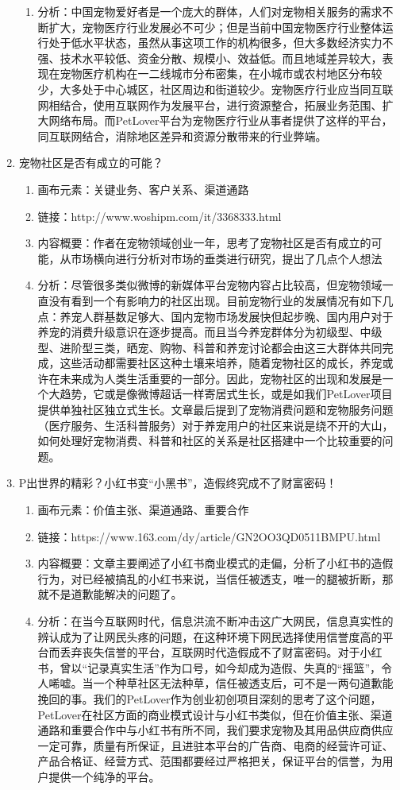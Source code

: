 \documentclass[a4paper]{ctexart}
\begin{document}
\begin{enumerate}[label=\alph*.]
\begin{enumerate}[label=\alph*.]
    \item 分析：中国宠物爱好者是一个庞大的群体，人们对宠物相关服务的需求不断扩大，宠物医疗行业发展必不可少；但是当前中国宠物医疗行业整体运行处于低水平状态，虽然从事这项工作的机构很多，但大多数经济实力不强、技术水平较低、资金分散、规模小、效益低。而且地域差异较大，表现在宠物医疗机构在一二线城市分布密集，在小城市或农村地区分布较少，大多处于中心城区，社区周边和街道较少。宠物医疗行业应当同互联网相结合，使用互联网作为发展平台，进行资源整合，拓展业务范围、扩大网络布局。而PetLover平台为宠物医疗行业从事者提供了这样的平台，同互联网结合，消除地区差异和资源分散带来的行业弊端。
  \end{enumerate}
  \item 宠物社区是否有成立的可能？
  \begin{enumerate}[label=\alph*.]
    \item 画布元素：关键业务、客户关系、渠道通路
    \item 链接：http://www.woshipm.com/it/3368333.html
    \item 内容概要：作者在宠物领域创业一年，思考了宠物社区是否有成立的可能，从市场横向进行分析对市场的垂类进行研究，提出了几点个人想法
    \item 分析：尽管很多类似微博的新媒体平台宠物内容占比较高，但宠物领域一直没有看到一个有影响力的社区出现。目前宠物行业的发展情况有如下几点：养宠人群基数足够大、国内宠物市场发展快但起步晚、国内用户对于养宠的消费升级意识在逐步提高。而且当今养宠群体分为初级型、中级型、进阶型三类，晒宠、购物、科普和养宠讨论都会由这三大群体共同完成，这些活动都需要社区这种土壤来培养，随着宠物社区的成长，养宠或许在未来成为人类生活重要的一部分。因此，宠物社区的出现和发展是一个大趋势，它或是像微博超话一样寄居式生长，或是如我们PetLover项目提供单独社区独立式生长。文章最后提到了宠物消费问题和宠物服务问题（医疗服务、生活科普服务）对于养宠用户的社区来说是绕不开的大山，如何处理好宠物消费、科普和社区的关系是社区搭建中一个比较重要的问题。
  \end{enumerate}
  \item P出世界的精彩？小红书变“小黑书”，造假终究成不了财富密码！
  \begin{enumerate}[label=\alph*.]
    \item 画布元素：价值主张、渠道通路、重要合作
    \item 链接：https://www.163.com/dy/article/GN2OO3QD0511BMPU.html
    \item 内容概要：文章主要阐述了小红书商业模式的走偏，分析了小红书的造假行为，对已经被搞乱的小红书来说，当信任被透支，唯一的腿被折断，那就不是道歉能解决的问题了。
    \item 分析：在当今互联网时代，信息洪流不断冲击这广大网民，信息真实性的辨认成为了让网民头疼的问题，在这种环境下网民选择使用信誉度高的平台而丢弃丧失信誉的平台，互联网时代造假成不了财富密码。对于小红书，曾以“记录真实生活”作为口号，如今却成为造假、失真的“摇篮”，令人唏嘘。当一个种草社区无法种草，信任被透支后，可不是一两句道歉能挽回的事。我们的PetLover作为创业初创项目深刻的思考了这个问题，PetLover在社区方面的商业模式设计与小红书类似，但在价值主张、渠道通路和重要合作中与小红书有所不同，我们要求宠物及其用品供应商供应一定可靠，质量有所保证，且进驻本平台的广告商、电商的经营许可证、产品合格证、经营方式、范围都要经过严格把关，保证平台的信誉，为用户提供一个纯净的平台。

\end{enumerate}
\end{enumerate}
\end{document}
